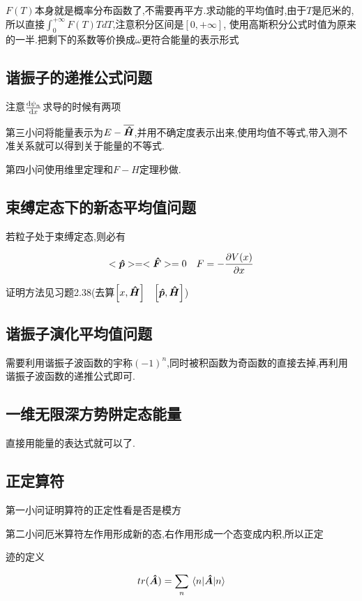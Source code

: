 \documentclass{article}
\begin{document}
            $F(T)$本身就是概率分布函数了,不需要再平方.求动能的平均值时,由于$T$是厄米的,所以直接$\int_{0}^{+\infty} F(T) T dT $,注意积分区间是$[0,+\infty]$,
            使用高斯积分公式时值为原来的一半.把剩下的系数等价换成$\omega$更符合能量的表示形式

        \subsection{谐振子的递推公式问题}
            注意$\dv{\psi_{n}}{x}$求导的时候有两项

            第三小问将能量表示为$E - \overline{\vu*{H}} $,并用不确定度表示出来,使用均值不等式,带入测不准关系就可以得到关于能量的不等式.

            第四小问使用维里定理和$F-H$定理秒做.

        \subsection{束缚定态下的新态平均值问题}
            \begin{formal}
                
                若粒子处于束缚定态,则必有
                
                $$ <\vu*{p}> = <\vu*{F}> = 0 \quad F = -\pdv{V(x)}{x} $$

                证明方法见习题2.38(去算$\comm{x}{\vu*{H}} \quad \comm{\vu*{p}}{\vu*{H}}$)
            \end{formal}

        \subsection{谐振子演化平均值问题}
            需要利用谐振子波函数的宇称$(-1)^{n}$,同时被积函数为奇函数的直接去掉,再利用谐振子波函数的递推公式即可.


        \subsection{一维无限深方势阱定态能量}
            直接用能量的表达式就可以了.
        \subsection{正定算符}
            第一小问证明算符的正定性看是否是模方

            第二小问厄米算符左作用形成新的态,右作用形成一个态变成内积,所以正定

            \begin{formal}
                迹的定义

                $$ tr(\vu*{A}) = \sum_{n} \mel{n}{\vu*{A}}{n} $$
            \end{formal}
\end{document}
